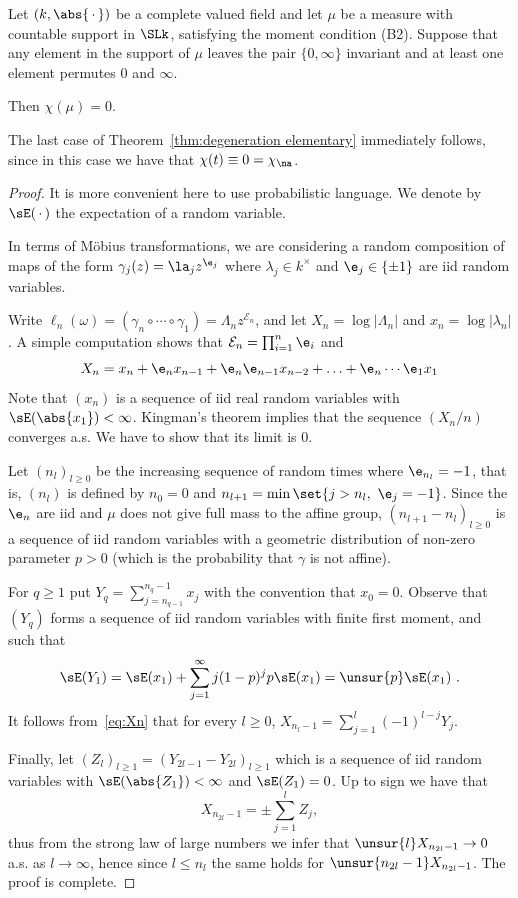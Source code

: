 \begin{prop}\label{prop:formula 0infty}
Let $(k,\abs{{\,\cdot\,}})$ be a complete valued field and let $\mu$ be a measure with countable support in $\SLk$, satisfying the moment condition (B2). Suppose that any element in the support of $\mu$ leaves the pair $\{0,\infty\}$ invariant and at least one element permutes $0$ and $\infty$.

Then $\chi(\mu) = 0$.
\end{prop}

The last case of Theorem~\ref{thm:degeneration elementary} immediately follows, since in this case we have that $\chi(t) \equiv 0 = \chi_\na $.

\begin{proof}
It is more convenient here to use probabilistic language. We denote by $\sE({\,\cdot\,})$ the expectation of a random variable.

In terms of M\"obius transformations, we are considering a random composition of maps of the form $\gamma_j(z) = \la_j z^{\e_j}$ where $\lambda_j\in k^\times$ and $\e_j \in \{\pm1\}$ are iid random variables.

Write $\ell_n(\omega) = (\gamma_n \circ \cdots \circ \gamma_1) = \Lambda_n z^{\mathcal{E}_n}$, and let $X_n = \log |\Lambda_n|$ and $x_n = \log|\lambda_n|$. A simple computation shows that $\mathcal{E}_n = \prod_{i=1}^{n} \e_i$ and
\begin{equation}\label{eq:Xn}
X_n = x_n + \e_n x_{n-1} + \e_n \e_{n-1} x_{n-2} + \ldots + \e_n\cdots \e_1 x_1
\end{equation}
Note that $(x_n)$ is a sequence of iid real random variables with $\sE(\abs{x_1})<\infty$. Kingman's theorem implies that the sequence $(X_n/n)$ converges a.s. We have to show that its limit is 0.

Let $(n_l)_{l\ge0}$ be the increasing sequence of random times where $\e_{n_l} = -1$, that is, $(n_l)$ is defined by $n_0=0$ and $n_{l+1} = \min\set{j> n_l, \ \e_j = -1}$. Since the $\e_n$ are iid and $\mu$ does not give full mass to the affine group, $(n_{l+1} - n_l)_{l\geq 0}$ is a sequence of iid random variables with a geometric distribution of non-zero parameter $p>0$ (which is the probability that $\gamma$ is not affine).

For $q\geq 1$ put $Y_q = \sum_{j=n_{q-1}}^{n_{q}-1} x_j$ with the convention that $x_0=0$. Observe that $(Y_q)$ forms a sequence of iid random variables with finite first moment, and such that
\[
\sE({Y_1}) = \sE({x_1})+ \sum_{j=1}^{\infty} j(1-p)^j p \sE({x_1}) = \unsur{p} \sE({x_1})~.
\]
It follows from~\eqref{eq:Xn} that for every $l\geq 0$, $X_{n_l-1} = \sum_{j=1}^l (-1)^{l-j} Y_j$.

Finally, let $(Z_{l})_{l\geq 1} =(Y_{2l-1}-Y_{2l})_{l\geq 1} $ which is a sequence of iid random variables with $\sE(\abs{Z_1})<\infty$ and $\sE({Z_1})=0$. Up to sign we have that
\[
X_{n_{2l}-1} = \pm \sum_{j=1}^l Z_j,
\]
thus from the strong law of large numbers we infer that $\unsur{l} X_{n_{2l}-1} \to 0$ a.s. as $l\to \infty$, hence since $l\le n_l$ the same holds for $\unsur{n_{2l}-1} X_{n_{2l}-1}$. The proof is complete.
\end{proof}

